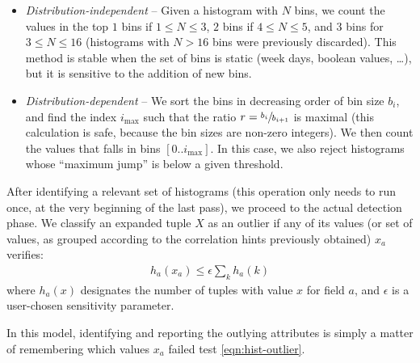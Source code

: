 \begin{itemize}
\item \emph{Distribution-independent} -- Given a histogram with $N$ bins, we count the values in the top $1$ bins if $1 \leq N \leq 3$, $2$ bins if $4 \leq N \leq 5$, and $3$ bins for $3 \leq N \leq 16$ (histograms with $N > 16$ bins were previously discarded). This method is stable when the set of bins is static (week days, boolean values, \ldots), but it is sensitive to the addition of new bins.
\item \emph{Distribution-dependent} -- We sort the bins in decreasing order of bin size $b_i$, and find the index $i_{\max}$ such that the ratio $r = \sfrac{b_i}{b_{i+1}}$ is maximal (this calculation is safe, because the bin sizes are non-zero integers). We then count the values that falls in bins $[0 .. i_{\max}]$. In this case, we also reject histograms whose ``maximum jump'' is below a given threshold.
\end{itemize}

After identifying a relevant set of histograms (this operation only needs to run once, at the very beginning of the last pass), we proceed to the actual detection phase. We classify an expanded tuple $X$ as an outlier if any of its values (or set of values, as grouped according to the correlation hints previously obtained) $x_a$ verifies:
\begin{align}
h_a(x_a) \le \epsilon \sum_k h_a(k)
\label{eqn:hist-outlier}
\end{align}
where $h_a(x)$ designates the number of tuples with value $x$ for field $a$, and $\epsilon$ is a user-chosen sensitivity parameter.

In this model, identifying and reporting the outlying attributes is simply a matter of remembering which values $x_a$ failed test \ref{eqn:hist-outlier}.
